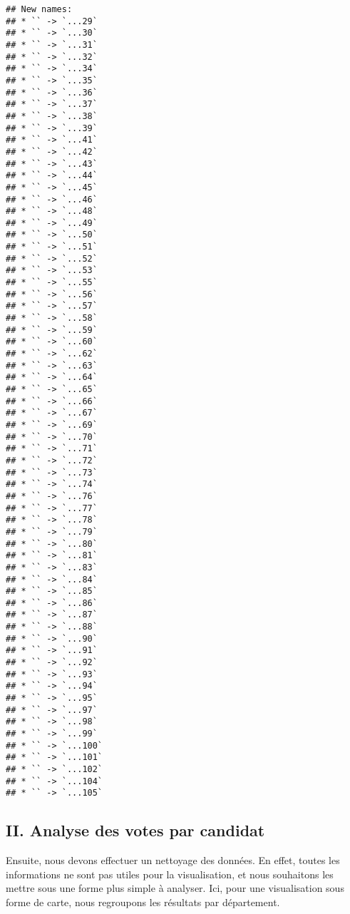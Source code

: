 \documentclass[
]{article}
\begin{document}
\begin{verbatim}
## New names:
## * `` -> `...29`
## * `` -> `...30`
## * `` -> `...31`
## * `` -> `...32`
## * `` -> `...34`
## * `` -> `...35`
## * `` -> `...36`
## * `` -> `...37`
## * `` -> `...38`
## * `` -> `...39`
## * `` -> `...41`
## * `` -> `...42`
## * `` -> `...43`
## * `` -> `...44`
## * `` -> `...45`
## * `` -> `...46`
## * `` -> `...48`
## * `` -> `...49`
## * `` -> `...50`
## * `` -> `...51`
## * `` -> `...52`
## * `` -> `...53`
## * `` -> `...55`
## * `` -> `...56`
## * `` -> `...57`
## * `` -> `...58`
## * `` -> `...59`
## * `` -> `...60`
## * `` -> `...62`
## * `` -> `...63`
## * `` -> `...64`
## * `` -> `...65`
## * `` -> `...66`
## * `` -> `...67`
## * `` -> `...69`
## * `` -> `...70`
## * `` -> `...71`
## * `` -> `...72`
## * `` -> `...73`
## * `` -> `...74`
## * `` -> `...76`
## * `` -> `...77`
## * `` -> `...78`
## * `` -> `...79`
## * `` -> `...80`
## * `` -> `...81`
## * `` -> `...83`
## * `` -> `...84`
## * `` -> `...85`
## * `` -> `...86`
## * `` -> `...87`
## * `` -> `...88`
## * `` -> `...90`
## * `` -> `...91`
## * `` -> `...92`
## * `` -> `...93`
## * `` -> `...94`
## * `` -> `...95`
## * `` -> `...97`
## * `` -> `...98`
## * `` -> `...99`
## * `` -> `...100`
## * `` -> `...101`
## * `` -> `...102`
## * `` -> `...104`
## * `` -> `...105`
\end{verbatim}

\hypertarget{ii.-analyse-des-votes-par-candidat}{%
\subsection{II. Analyse des votes par
candidat}\label{ii.-analyse-des-votes-par-candidat}}

Ensuite, nous devons effectuer un nettoyage des données. En effet,
toutes les informations ne sont pas utiles pour la visualisation, et
nous souhaitons les mettre sous une forme plus simple à analyser. Ici,
pour une visualisation sous forme de carte, nous regroupons les
résultats par département.
\end{document}
